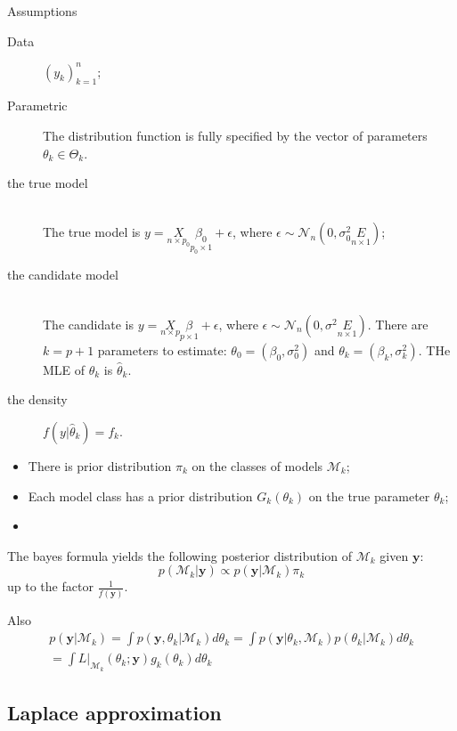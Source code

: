 \documentclass[a4paper]{article}
\newcommand{\brac}[1]{{\left ( #1 \right )}}
\newcommand{\induc}[1]{{\left . #1 \right \vert}}
\newcommand{\Mcal}{\mathcal{M}}
\newcommand{\Ncal}{\mathcal{N}}
\begin{document}
Assumptions \begin{description}
	\item[Data] $\brac{y_k}_{k=1}^n$;
	\item[Parametric] The distribution function is fully specified by the vector of parameters $\theta_k\in \Theta_k$.
	\item[the true model]\hfill\\
	The true model is $y = \underset{n\times p_0}{X}\underset{p_0\times 1}{\beta_0} + \epsilon$, where $\epsilon \sim \Ncal_n\brac{0,\sigma_0^2 \underset{n\times 1}{E}}$;
	\item[the candidate model] \hfill\\
	The candidate is $y = \underset{n\times p}{X}\underset{p\times 1}{\beta} + \epsilon$, where $\epsilon \sim \Ncal_n\brac{0,\sigma^2 \underset{n\times 1}{E}}$.
	There are $k=p+1$ parameters to estimate: $\theta_0 = \brac{\beta_0,\sigma_0^2}$ and $\theta_k = \brac{\beta_k,\sigma_k^2}$. THe MLE of $\theta_k$ is $\hat{\theta}_k$.
	\item[the density] $f\brac{\induc{y}\hat{\theta}_k} = f_k$.
\end{description}

\begin{itemize}
	\item There is prior distribution $\pi_k$ on the classes of models $\Mcal_k$;
	\item Each model class has a prior distribution $G_k\brac{\theta_k}$ on the true parameter $\theta_k$;
	\item 
\end{itemize}
The bayes formula yields the following posterior distribution of $\Mcal_k$ given $\mathbf{y}$:
\[p\brac{\induc{\Mcal_k}\mathbf{y}} \propto p\brac{\induc{\mathbf{y}}\Mcal_k} \pi_k\]
up to the factor $\frac{1}{f(\mathbf{y})}$.

Also
\begin{multline*}
p\brac{\induc{\mathbf{y}}\Mcal_k}
= \int p\brac{\induc{\mathbf{y}, \theta_k}\Mcal_k} d\theta_k
= \int p\brac{\induc{\mathbf{y}}\theta_k, \Mcal_k} p\brac{\induc{\theta_k}\Mcal_k}d\theta_k\\
= \int \induc{L}_{\Mcal_k}(\theta_k;\mathbf{y}) g_k(\theta_k) d\theta_k
\end{multline*}

\subsection{Laplace approximation} %
\label{sub:laplace_approximation}
\end{document}
